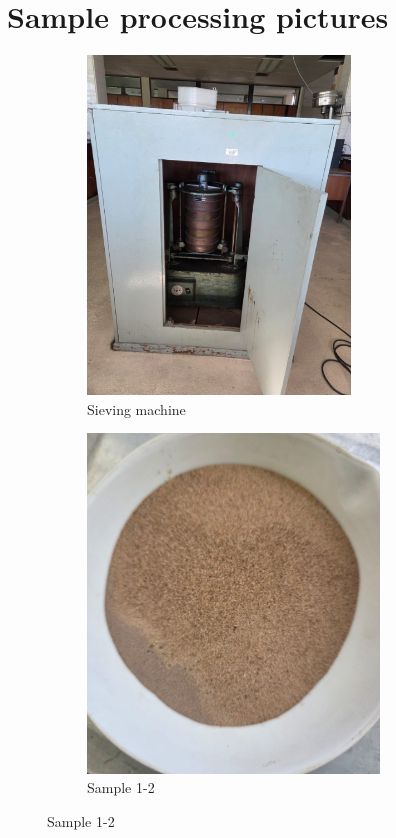 \section{Sample processing pictures}

\begin{figure}[H]
    \centering
    \begin{subfigure}[b]{0.48\textwidth}
        \includegraphics[width=\linewidth, height =9cm]{figures/appendix-f/sievingmachine.png}
        \caption{Sieving machine}
        \label{fig:SM}
    \end{subfigure}
    \hfill
    \begin{subfigure}[b]{0.48\textwidth}
        \includegraphics[width=\linewidth, height =9cm]{figures/appendix-f/sand.png}
        \caption{Sample 1-2}
        \label{fig:second}
    \end{subfigure}
    


\end{figure}
